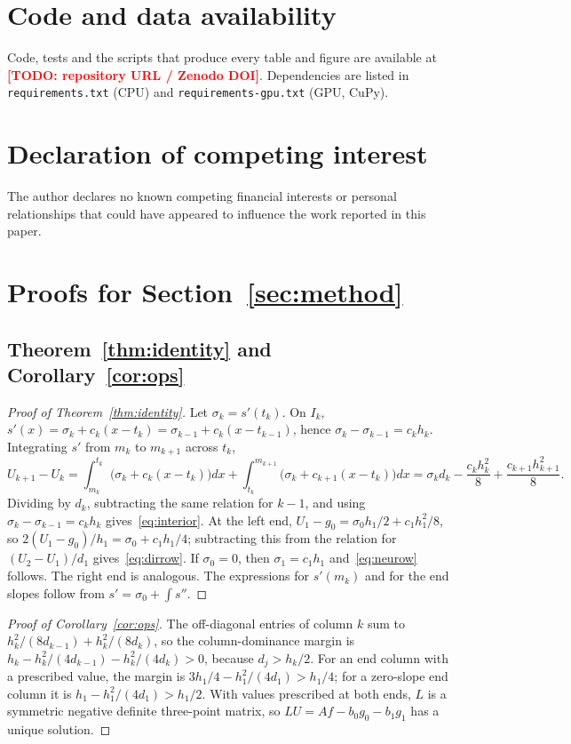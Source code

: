 \documentclass[preprint,12pt]{elsarticle}
\theoremstyle{remark}
\newcommand{\todo}[1]{\textcolor{red}{\textbf{[TODO: #1]}}}
\begin{document}
\section*{Code and data availability}
Code, tests and the scripts that produce every table and figure are available at \todo{repository URL /
Zenodo DOI}. Dependencies are listed in \texttt{requirements.txt} (CPU) and
\texttt{requirements-gpu.txt} (GPU, CuPy).

\section*{Declaration of competing interest}
The author declares no known competing financial interests or personal relationships that could have
appeared to influence the work reported in this paper.

\clearpage
\appendix
\section{Proofs for Section~\ref{sec:method}}\label{app:ops}
\subsection{Theorem~\ref{thm:identity} and Corollary~\ref{cor:ops}}\label{app:identity}
\begin{proof}[Proof of Theorem~\ref{thm:identity}]
Let $\sigma_k=s'(t_k)$. On $I_k$, $s'(x)=\sigma_k+c_k(x-t_k)=\sigma_{k-1}+c_k(x-t_{k-1})$, hence
$\sigma_k-\sigma_{k-1}=c_kh_k$. Integrating $s'$ from $m_k$ to $m_{k+1}$ across $t_k$,
\[
U_{k+1}-U_k=\int_{m_k}^{t_k}\!\big(\sigma_k+c_k(x-t_k)\big)dx+\int_{t_k}^{m_{k+1}}\!\big(\sigma_k+c_{k+1}(x-t_k)\big)dx
=\sigma_kd_k-\frac{c_kh_k^2}{8}+\frac{c_{k+1}h_{k+1}^2}{8}.
\]
Dividing by $d_k$, subtracting the same relation for $k-1$, and using
$\sigma_k-\sigma_{k-1}=c_kh_k$ gives~\eqref{eq:interior}. At the left end,
$U_1-g_0=\sigma_0h_1/2+c_1h_1^2/8$, so $2(U_1-g_0)/h_1=\sigma_0+c_1h_1/4$; subtracting this from the
relation for $(U_2-U_1)/d_1$ gives~\eqref{eq:dirrow}. If $\sigma_0=0$, then $\sigma_1=c_1h_1$
and~\eqref{eq:neurow} follows. The right end is analogous. The expressions for $s'(m_k)$ and for the
end slopes follow from $s'=\sigma_0+\int s''$.
\end{proof}
\begin{proof}[Proof of Corollary~\ref{cor:ops}]
The off-diagonal entries of column $k$ sum to $h_k^2/(8d_{k-1})+h_k^2/(8d_k)$, so the column-dominance
margin is $h_k-h_k^2/(4d_{k-1})-h_k^2/(4d_k)>0$, because $d_j>h_k/2$. For an end column with a
prescribed value, the margin is $3h_1/4-h_1^2/(4d_1)>h_1/4$; for a zero-slope end column it is
$h_1-h_1^2/(4d_1)>h_1/2$. With values prescribed at both ends, $L$ is a symmetric negative definite
three-point matrix, so $LU=Af-b_0g_0-b_1g_1$ has a unique solution.
\end{proof}
\end{document}
